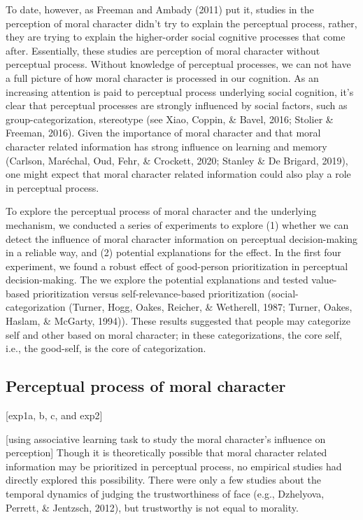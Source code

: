 \documentclass[
  english,
  man]{apa6}
\begin{document}
To date, however, as Freeman and Ambady (2011) put it, studies in the perception of moral character didn't try to explain the perceptual process, rather, they are trying to explain the higher-order social cognitive processes that come after. Essentially, these studies are perception of moral character without perceptual process. Without knowledge of perceptual processes, we can not have a full picture of how moral character is processed in our cognition. As an increasing attention is paid to perceptual process underlying social cognition, it's clear that perceptual processes are strongly influenced by social factors, such as group-categorization, stereotype (see Xiao, Coppin, \& Bavel, 2016; Stolier \& Freeman, 2016). Given the importance of moral character and that moral character related information has strong influence on learning and memory (Carlson, Maréchal, Oud, Fehr, \& Crockett, 2020; Stanley \& De Brigard, 2019), one might expect that moral character related information could also play a role in perceptual process.

To explore the perceptual process of moral character and the underlying mechanism, we conducted a series of experiments to explore (1) whether we can detect the influence of moral character information on perceptual decision-making in a reliable way, and (2) potential explanations for the effect. In the first four experiment, we found a robust effect of good-person prioritization in perceptual decision-making. The we explore the potential explanations and tested value-based prioritization versus self-relevance-based prioritization (social-categorization (Turner, Hogg, Oakes, Reicher, \& Wetherell, 1987; Turner, Oakes, Haslam, \& McGarty, 1994)). These results suggested that people may categorize self and other based on moral character; in these categorizations, the core self, i.e., the good-self, is the core of categorization.

\hypertarget{perceptual-process-of-moral-character}{%
\subsection{Perceptual process of moral character}\label{perceptual-process-of-moral-character}}

{[}exp1a, b, c, and exp2{]}

{[}using associative learning task to study the moral character's influence on perception{]} Though it is theoretically possible that moral character related information may be prioritized in perceptual process, no empirical studies had directly explored this possibility. There were only a few studies about the temporal dynamics of judging the trustworthiness of face (e.g., Dzhelyova, Perrett, \& Jentzsch, 2012), but trustworthy is not equal to morality.
\end{document}
